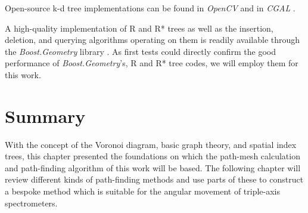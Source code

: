Open-source k-d tree implementations can be found in \textit{OpenCV} \cite{web_opencv} 
and in \textit{CGAL} \cite{web_cgal}.

A high-quality implementation of R and R* trees as well as the insertion, deletion, and querying algorithms 
operating on them is readily available through the \textit{Boost.Geometry} library \cite{web_boost_geometry, web_boost_geometry_rtree}. As first tests could directly confirm the good performance of \textit{Boost.Geometry}'s,
R and R* tree codes, we will employ them for this work.



\section{Summary}
With the concept of the Voronoi diagram, basic graph theory, and spatial index trees, 
this chapter presented the foundations on which the path-mesh calculation and path-finding
algorithm of this work will be based. The following chapter will review different kinds
of path-finding methods and use parts of these to construct a bespoke method which
is suitable for the angular movement of triple-axis spectrometers.
